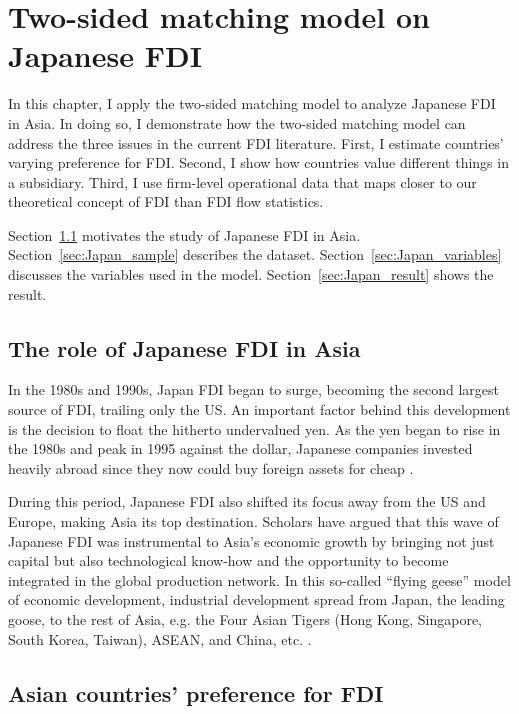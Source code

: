 \chapter{Two-sided matching model on Japanese FDI}
\label{chap:FDI}

In this chapter, I apply the two-sided matching model to analyze Japanese FDI in
Asia. In doing so, I demonstrate how the two-sided matching model can address
the three issues in the current FDI literature. First, I estimate
countries' varying preference for FDI. Second, I show how countries value
different things in a subsidiary. Third, I use firm-level operational data that
maps closer to our theoretical concept of FDI than FDI flow statistics.

Section~\ref{sec:Japan_FDI_in_Asia} motivates the study of Japanese FDI in Asia.
Section~\ref{sec:Japan_sample} describes the dataset.
Section~\ref{sec:Japan_variables} discusses the variables used in the model.
Section~\ref{sec:Japan_result} shows the result.

\section{The role of Japanese FDI in Asia}
\label{sec:Japan_FDI_in_Asia}

In the 1980s and 1990s, Japan FDI began to surge, becoming the second largest
source of FDI, trailing only the US. An important factor behind
this development is the decision to float the hitherto undervalued yen. As the yen began
to rise in the 1980s and peak in 1995 against the dollar,
Japanese companies invested heavily abroad since they now could buy foreign assets
for cheap \citep{Delios2001}.

During this period, Japanese FDI also shifted its focus away from the US and
Europe, making Asia its top destination. Scholars
have argued that this wave of Japanese FDI was instrumental to Asia's
economic growth by bringing not just capital but also technological know-how and
the opportunity to become integrated in the global production network. In this
so-called ``flying geese'' model of economic development, industrial development
spread from Japan, the leading goose, to the rest of Asia, e.g. the Four Asian
Tigers (Hong Kong, Singapore, South Korea, Taiwan), ASEAN, and China, etc.
\citep{Bernard1995, Kojima2000}.

\section{Asian countries' preference for FDI}

